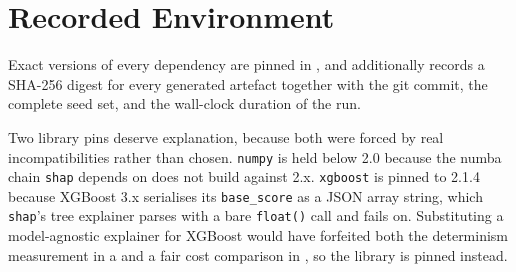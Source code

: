 \chapter{Recorded Environment}\label{app:environment}



Exact versions of every dependency are pinned in , and
 additionally records a SHA-256 digest for every generated
artefact together with the git commit, the complete seed set, and the wall-clock
duration of the run.

Two library pins deserve explanation, because both were forced by real
incompatibilities rather than chosen. \texttt{numpy} is held below 2.0 because the
numba chain \texttt{shap} depends on does not build against 2.x. \texttt{xgboost} is
pinned to 2.1.4 because XGBoost 3.x serialises its \texttt{base\_score} as a JSON array
string, which \texttt{shap}'s tree explainer parses with a bare \texttt{float()} call
and fails on. Substituting a model-agnostic explainer for XGBoost would have forfeited
both the determinism measurement in a and a fair cost comparison in , so the
library is pinned instead.
